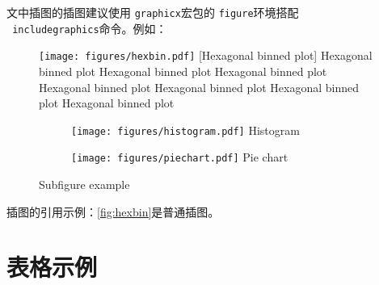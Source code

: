 文中插图的插图建议使用 \texttt{graphicx}宏包的 \texttt{figure}环境搭配 \\ \texttt{ includegraphics}命令。例如：
\begin{figure}[htbp]
	\centering
	\texttt{[image: figures/hexbin.pdf]}
	[Hexagonal binned plot]
    {Hexagonal binned plot Hexagonal binned plot Hexagonal binned plot Hexagonal binned plot Hexagonal binned plot Hexagonal binned plot Hexagonal binned plot}
	\label{fig:hexbin}
\end{figure}
\begin{figure}[htbp]
	\centering
    \begin{subfigure}{0.45\textwidth}
        \centering
	    \texttt{[image: figures/histogram.pdf]}
        {Histogram}
    \end{subfigure}
    \begin{subfigure}{0.45\textwidth}
        \centering
	    \texttt{[image: figures/piechart.pdf]}
        {Pie chart}
    \end{subfigure}
    {Subfigure example}
    \label{fig:subfig}
\end{figure}

插图的引用示例：\autoref{fig:hexbin}是普通插图。

\section{表格示例}

